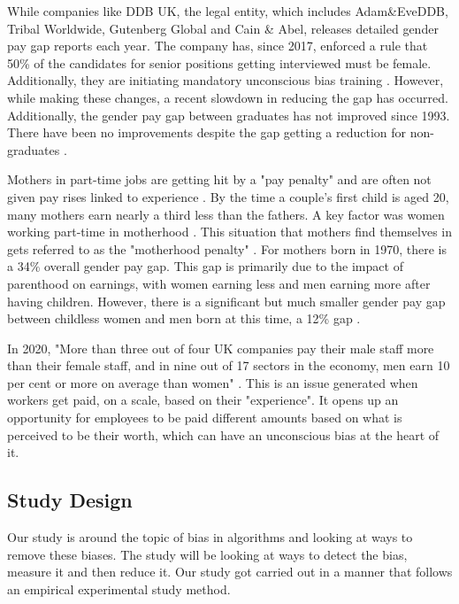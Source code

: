 \documentclass{sigchi}
\begin{document}
	While companies like DDB UK, the legal entity, which includes Adam\&EveDDB, Tribal Worldwide, Gutenberg Global and Cain \& Abel, releases detailed gender pay gap reports each year. The company has, since 2017, enforced a rule that 50\% of the candidates for senior positions getting interviewed must be female. Additionally, they are initiating mandatory unconscious bias training \cite{uk_gender_gap}. However, while making these changes, a recent slowdown in reducing the gap has occurred. Additionally, the gender pay gap between graduates has not improved since 1993. There have been no improvements despite the gap getting a reduction for non-graduates \cite{bbc_mothers_suffering}.
	
	Mothers in part-time jobs are getting hit by a "pay penalty" and are often not given pay rises linked to experience \cite{bbc_mothers_suffering}.
	By the time a couple's first child is aged 20, many mothers earn nearly a third less than the fathers. A key factor was women working part-time in motherhood \cite{ifs_mothers_suffer}. This situation that mothers find themselves in gets referred to as the "motherhood penalty" \cite{tuc_motherhood}. For mothers born in 1970, there is a 34\% overall gender pay gap. This gap is primarily due to the impact of parenthood on earnings, with women earning less and men earning more after having children. However, there is a significant but much smaller gender pay gap between childless women and men born at this time, a 12\% gap \cite{tuc_motherhood}.
	
	
	In 2020, "More than three out of four UK companies pay their male staff more than their female staff, and in nine out of 17 sectors in the economy, men earn 10 per cent or more on average than women" \cite{gender_pay_FT}. This is an issue generated when workers get paid, on a scale, based on their "experience". It opens up an opportunity for employees to be paid different amounts based on what is perceived to be their worth, which can have an unconscious bias at the heart of it. %
	
	

\subsection{Study Design}
	Our study is around the topic of bias in algorithms and looking at ways to remove these biases. The study will be looking at ways to detect the bias, measure it and then reduce it. Our study got carried out in a manner that follows an empirical experimental study method. 
\end{document}
